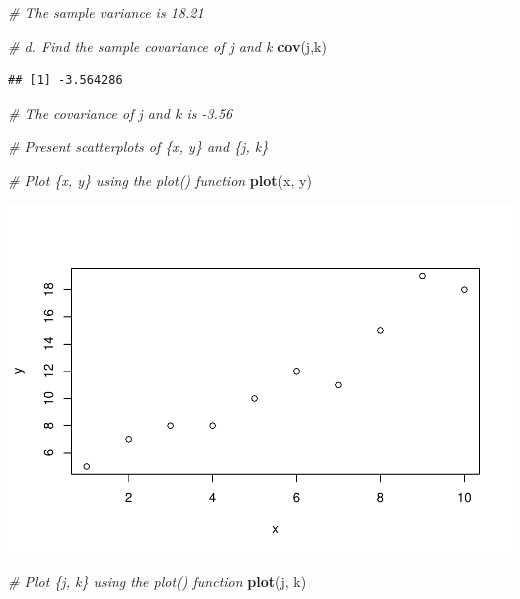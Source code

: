 \documentclass[]{article}
\newenvironment{Shaded}{\begin{snugshade}}{\end{snugshade}}
\newcommand{\KeywordTok}[1]{\textcolor[rgb]{0.13,0.29,0.53}{\textbf{#1}}}
\newcommand{\CommentTok}[1]{\textcolor[rgb]{0.56,0.35,0.01}{\textit{#1}}}
\newcommand{\NormalTok}[1]{#1}
\begin{document}
\begin{Shaded}
\begin{Highlighting}[]
\CommentTok{# The sample variance is 18.21}

\CommentTok{# d. Find the sample covariance of j and k}
\KeywordTok{cov}\NormalTok{(j,k)}
\end{Highlighting}
\end{Shaded}

\begin{verbatim}
## [1] -3.564286
\end{verbatim}

\begin{Shaded}
\begin{Highlighting}[]
\CommentTok{# The covariance of j and k is -3.56}

\CommentTok{# Present scatterplots of \{x, y\} and \{j, k\}}

\CommentTok{# Plot \{x, y\} using the plot() function}
\KeywordTok{plot}\NormalTok{(x, y)}
\end{Highlighting}
\end{Shaded}

\includegraphics{macroNoGiodP_files/figure-latex/unnamed-chunk-4-1.pdf}

\begin{Shaded}
\begin{Highlighting}[]
\CommentTok{# Plot \{j, k\} using the plot() function}
\KeywordTok{plot}\NormalTok{(j, k)}
\end{Highlighting}
\end{Shaded}
\end{document}
